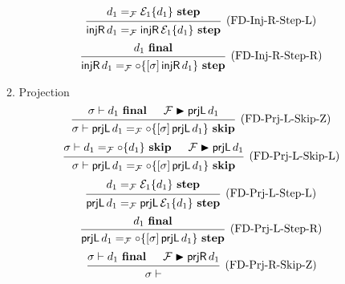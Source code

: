 \documentclass{article}
\newcommand{\entails}{\mathrel{\mathop{\vdash}}}
\newcommand{\skips}{\mathrel{\mathop{\blacktriangleright}}}
\newcommand{\final}{~\mathbf{final}}
\newcommand{\istep}{~\mathbf{step}}
\newcommand{\iskip}{~\mathbf{skip}}
\newcommand{\inr}{\operatorname{\mathsf{injR}}}
\newcommand{\prl}{\operatorname{\mathsf{prjL}}}
\newcommand{\prr}{\operatorname{\mathsf{prjR}}}
\begin{document}
\begin{enumerate}
\begin{enumerate}
\[\begin{prooftree}
            \hypo{d_1 =_\mathcal{F} \mathcal{E}_1 \{ d_1 \} \istep}
            \infer1[(FD-Inj-R-Step-L)]{
              \inr d_1
              =_\mathcal{F}
              \inr \mathcal{E}_1 \{ d_1 \} \istep
            }
          \end{prooftree}
        \]
        \[
          \begin{prooftree}
            \hypo{d_1 \final}
            \infer1[(FD-Inj-R-Step-R)]{
              \inr d_1
              =_\mathcal{F}
              \circ \{ [\sigma] \inr d_1 \} \istep
            }
          \end{prooftree}
        \]

      \item Projection
        \[
          \begin{prooftree}
            \hypo{\sigma \entails d_1 \final}
            \hypo{\mathcal{F} \skips \prl d_1}
            \infer2[(FD-Prj-L-Skip-Z)]{
              \sigma \entails
              \prl d_1
              =_\mathcal{F}
              \circ \{ [\sigma] \prl d_1 \} \iskip
            }
          \end{prooftree}
        \]
        \[
          \begin{prooftree}
            \hypo{\sigma \entails d_1 =_\mathcal{F} \circ \{ d_1 \} \iskip}
            \hypo{\mathcal{F} \skips \prl d_1}
            \infer2[(FD-Prj-L-Skip-L)]{
              \sigma \entails
              \prl d_1
              =_\mathcal{F}
              \circ \{ [\sigma] \prl d_1 \} \iskip
            }
          \end{prooftree}
        \]
        \[
          \begin{prooftree}
            \hypo{d_1 =_\mathcal{F} \mathcal{E}_1 \{ d_1 \} \istep}
            \infer1[(FD-Prj-L-Step-L)]{
              \prl d_1
              =_\mathcal{F}
              \prl \mathcal{E}_1 \{ d_1 \} \istep
            }
          \end{prooftree}
        \]
        \[
          \begin{prooftree}
            \hypo{d_1 \final}
            \infer1[(FD-Prj-L-Step-R)]{
              \prl d_1
              =_\mathcal{F}
              \circ \{ [\sigma] \prl d_1 \} \istep
            }
          \end{prooftree}
        \]
        \[
          \begin{prooftree}
            \hypo{\sigma \entails d_1 \final}
            \hypo{\mathcal{F} \skips \prr d_1}
            \infer2[(FD-Prj-R-Skip-Z)]{
              \sigma \entails
}
\end{prooftree}\]
\end{enumerate}
\end{enumerate}
\end{document}
